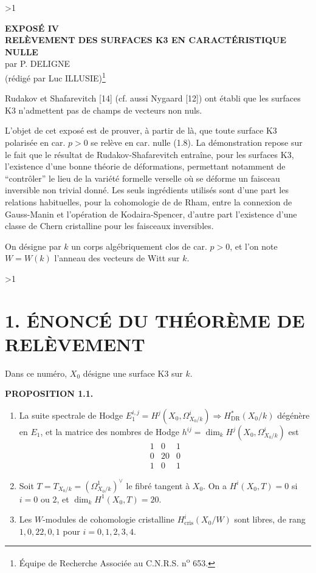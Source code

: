 \documentclass[10pt]{article}
\makeatletter
\newcommand{\cris}{\mathrm{cris}}
\newcommand{\sourceanchor}[2]{\begingroup\def\@currentlabel{#2}\label{#1}\endgroup}
\newenvironment{sourcestatement}[3]{\par\smallskip\noindent\textbf{#1 #2.}\sourceanchor{#3}{#2}\ \itshape}{\par\normalfont\smallskip}
\newcommand{\DPage}[2]{\ifnum#1>1\clearpage\fi\setcounter{page}{#2}}
\makeatother
\begin{document}
\DPage{1}{58}
\begin{center}
\textbf{EXPOSÉ IV}\\[2.2em]
\textbf{RELÈVEMENT DES SURFACES K3 EN CARACTÉRISTIQUE NULLE}\\[1.8em]
par P. DELIGNE\\[0.35em]
(rédigé par Luc ILLUSIE)\footnote{Équipe de Recherche Associée au C.N.R.S. n\textsuperscript{o} 653.}
\end{center}

Rudakov et Shafarevitch [14] (cf. aussi Nygaard [12]) ont établi que les surfaces K3 n'admettent pas de champs de vecteurs non nuls.

L'objet de cet exposé est de prouver, à partir de là, que toute surface K3 polarisée en car. $p > 0$ se relève en car. nulle (1.8). La démonstration repose sur le fait que le résultat de Rudakov-Shafarevitch entraîne, pour les surfaces K3, l'existence d'une bonne théorie de déformations, permettant notamment de ``contrôler'' le lieu de la variété formelle verselle où se déforme un faisceau inversible non trivial donné. Les seuls ingrédients utilisés sont d'une part les relations habituelles, pour la cohomologie de de Rham, entre la connexion de Gauss-Manin et l'opération de Kodaira-Spencer, d'autre part l'existence d'une classe de Chern cristalline pour les faisceaux inversibles.

On désigne par $k$ un corps algébriquement clos de car. $p > 0$, et l'on note $W = W(k)$ l'anneau des vecteurs de Witt sur $k$.

\DPage{2}{59}\section*{1. ÉNONCÉ DU THÉORÈME DE RELÈVEMENT}\sourceanchor{sec:1}{1}

Dans ce numéro, $X_0$ désigne une surface K3 sur $k$.

\begin{sourcestatement}{PROPOSITION}{1.1}{prop:1.1}

\begin{enumerate}[label=\alph*)]
\item La suite spectrale de Hodge $E_1^{i,j} = H^j(X_0, \Omega_{X_0/k}^i) \Rightarrow H^*_{\mathrm{DR}}(X_0/k)$ dégénère en $E_1$, et la matrice des nombres de Hodge $h^{ij} = \dim_k H^j(X_0, \Omega_{X_0/k}^i)$ est
\[
\begin{matrix}
1 & 0 & 1 \\
0 & 20 & 0 \\
1 & 0 & 1
\end{matrix}
\]

\item Soit $T = T_{X_0/k} = (\Omega_{X_0/k}^1)^{\vee}$ le fibré tangent à $X_0$. On a $H^i(X_0, T) = 0$ si $i = 0$ ou $2$, et $\dim_k H^1(X_0, T) = 20$.

\item Les $W$-modules de cohomologie cristalline $H^i_{\cris}(X_0/W)$ sont libres, de rang $1, 0, 22, 0, 1$ pour $i = 0, 1, 2, 3, 4$.
\end{enumerate}
\end{sourcestatement}
\end{document}
